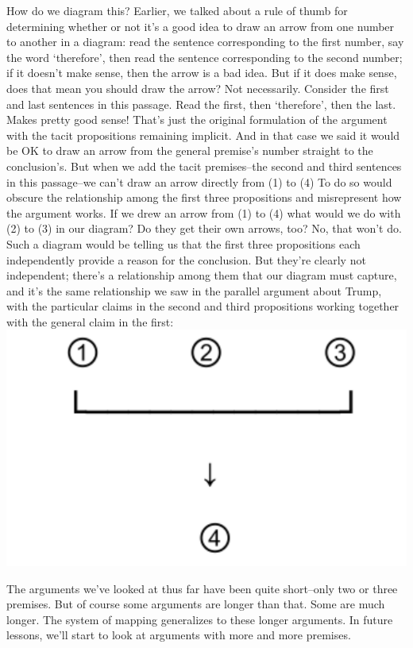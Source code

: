 How do we diagram this? Earlier, we talked about a rule of thumb for determining whether or not
it's a good idea to draw an arrow from one number to another in a diagram: read the sentence
corresponding to the first number, say the word `therefore', then read the sentence corresponding
to the second number; if it doesn't make sense, then the arrow is a bad idea. But if it does make
sense, does that mean you should draw the arrow? Not necessarily. Consider the first and last
sentences in this passage. Read the first, then `therefore', then the last. Makes pretty good sense!
That's just the original formulation of the argument with the tacit propositions remaining implicit.
And in that case we said it would be OK to draw an arrow from the general premise's number
straight to the conclusion's. But when we add the tacit premises--the second and third sentences
in this passage--we can't draw an arrow directly from (1) to (4) To do so would obscure the
relationship among the first three propositions and misrepresent how the argument works. If we
drew an arrow from (1) to (4) what would we do with (2) to (3) in our diagram? Do they get their
own arrows, too? No, that won't do. Such a diagram would be telling us that the first three
propositions each independently provide a reason for the conclusion. But they're clearly not
independent; there's a relationship among them that our diagram must capture, and it's the same
relationship we saw in the parallel argument about Trump, with the particular claims in the second
and third propositions working together with the general claim in the first: \\


\includegraphics[scale=.49]{diagram5.pdf}

The arguments we've looked at thus far have been quite short--only two or three premises. But of
course some arguments are longer than that. Some are much longer. The system of mapping generalizes 
to these longer arguments. In future lessons, we'll start to look at arguments with more and more 
premises.



